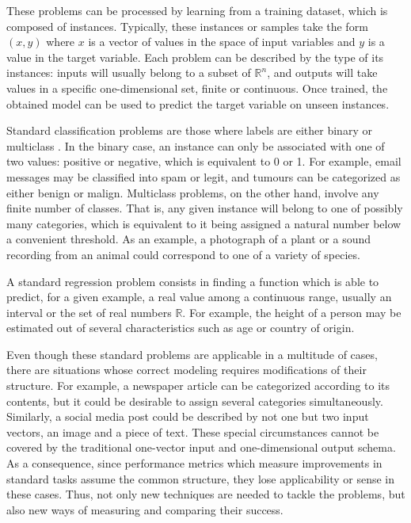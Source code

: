 These problems can be processed by learning from a training dataset, which is composed of instances. Typically, these instances or samples take the form $(x, y)$ where $x$ is a vector of values in the space of input variables and $y$ is a value in the target variable. Each problem can be described by the type of its instances: inputs will usually belong to a subset of $\mathbb R^n$, and outputs will take values in a specific one-dimensional set, finite or continuous. Once trained, the obtained model can be used to predict the target variable on unseen instances.

Standard classification problems are those where labels are either binary or multiclass . In the binary case, an instance can only be associated with one of two values: positive or negative, which is equivalent to 0 or 1. For example, email messages may be classified into spam or legit, and tumours can be categorized as either benign or malign. Multiclass problems, on the other hand, involve any finite number of classes. That is, any given instance will belong to one of possibly many categories, which is equivalent to it being assigned a natural number below a convenient threshold. As an example, a photograph of a plant or a sound recording from an animal could correspond to one of a variety of species. 

A standard regression problem  consists in finding a function which is able to predict, for a given example, a real value among a continuous range, usually an interval or the set of real numbers $\mathbb R$. For example, the height of a person may be estimated out of several characteristics such as age or country of origin.

Even though these standard problems are applicable in a multitude of cases, there are situations whose correct modeling requires modifications of their structure. For example, a newspaper article can be categorized according to its contents, but it could be desirable to assign several categories simultaneously. Similarly, a social media post could be described by not one but two input vectors, an image and a piece of text. These special circumstances cannot be covered by the traditional one-vector input and one-dimensional output schema. As a consequence, since performance metrics which measure improvements in standard tasks assume the common structure, they lose applicability or sense in these cases. Thus, not only new techniques are needed to tackle the problems, but also new ways of measuring and comparing their success.


